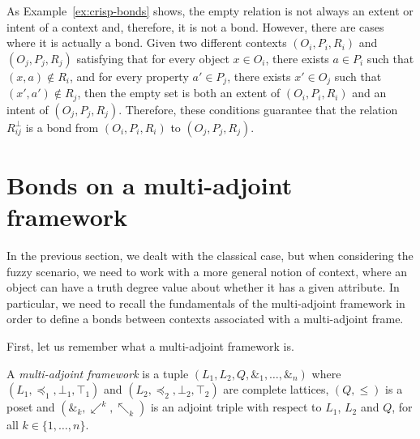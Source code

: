 \documentclass[runningheads,a4paper]{llncs}
\newcommand{\adjoint}{\mathop{\&}\nolimits}
\begin{document}
\begin{remark}\label{rem:bottom-bond-crisp}
As Example~\ref{ex:crisp-bonds} shows, the empty relation is not always an extent or intent of a context and, therefore, it is not a bond. However, there are cases where it is actually a bond. Given two different contexts $(O_i, P_i, R_i)$ and $(O_j, P_j, R_j)$ satisfying that for every object $x \in O_i$, there exists $a \in P_i$ such that $(x, a) \notin R_i$, and for every property $a' \in P_j$, there exists $x' \in O_j$ such that $(x', a') \notin R_j$, {then} the empty set is both an extent of $(O_i, P_i, R_i)$ and an intent of $(O_j, P_j, R_j)$. Therefore, these conditions guarantee that the relation $R_{ij}^\bot$ is a bond from $(O_i, P_i, R_i)$ to $(O_j, P_j, R_j)$.

\end{remark}

\section{Bonds on a multi-adjoint framework}\label{sec:multi-adjoint}

In the previous section, we dealt with the classical case, but when considering the fuzzy scenario, we need to work with a more general notion of context, where an object can have a truth degree value about whether it has a given attribute. In particular, we need to recall the fundamentals of the multi-adjoint framework in order to define a bonds between contexts associated with a multi-adjoint frame.

First, let us remember what a multi-adjoint framework is.

\begin{definition}
	
A \emph{multi-adjoint framework} is a tuple $(L_1, L_2, Q, \adjoint_1, \dots, \adjoint_n)$ where {$(L_1, \preceq_1, \bot_1, \top_1)$ and $(L_2, \preceq_2, \bot_2, \top_2)$} are complete lattices, $(Q, \leq)$ is a poset and $(\adjoint_k, \swarrow^k, \nwarrow_k)$ is an adjoint triple with respect to $L_1$, $L_2$ and $Q$, for all $k \in \{1, \dots, n\}$.

\end{definition}
\end{document}
